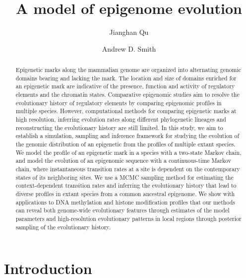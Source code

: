 \documentclass[11pt]{article}
\title{A model of epigenome evolution}
\author{Jianghan Qu \and Andrew D. Smith}
\begin{document}
\maketitle

\begin{abstract}
  Epigenetic marks along the mammalian genome are organized into
  alternating genomic domains bearing and lacking the mark. The
  location and size of domains enriched for an epigenetic mark are
  indicative of the presence, function and activity of regulatory
  elements and the chromatin states. Comparative epigenomic studies
  aim to resolve the evolutionary history of regulatory elements by
  comparing epigenomic profiles in multiple species.  However,
  computational methods for comparing epigenetic marks at high
  resolution, inferring evolution rates along different phylogenetic
  lineages and reconstructing the evolutionary history are still
  limited.  In this study, we aim to establish a simulation, sampling
  and inference framework for studying the evolution of the genomic
  distribution of an epigenetic from the profiles of multiple extant
  species.  We model the profile of an epigenetic mark in a species
  with a two-state Markov chain, and model the evolution of an
  epigenomic sequence with a continuous-time Markov chain, where
  instantaneous transition rates at a site is dependent on the
  contemporary states of its neighboring sites. We use a MCMC sampling
  method for estimating the context-dependent transition rates and
  inferring the evolutionary history that lead to diverse profiles in
  extant species from a common ancestral epigenome.  We show with
  applications to DNA methylation and histone modification profiles
  that our methods can reveal both genome-wide evolutionary features
  through estimates of the model parameters and high-resolution
  evolutionary patterns in local regions through posterior sampling of
  the evolutionary history.
\end{abstract}

\section{Introduction}
\end{document}
